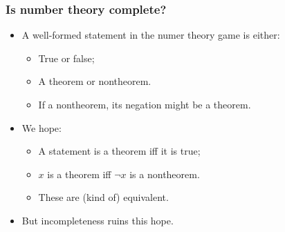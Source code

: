 \documentclass[mathserif]{beamer}
\begin{document}
\begin{frame}
\frametitle{Is number theory complete?}
\label{sec-2-5}
\begin{itemize}

\item A well-formed statement in the numer theory game is either:
\label{sec-2-5-1}%
\begin{itemize}

\item True or false;\\
\label{sec-2-5-1-1}%
\item A theorem or nontheorem.\\
\label{sec-2-5-1-2}%
\item If a nontheorem, its negation might be a theorem.\\
\label{sec-2-5-1-3}%
\end{itemize} %

\item We hope:
\label{sec-2-5-2}%
\begin{itemize}

\item A statement is a theorem iff it is true;\\
\label{sec-2-5-2-1}%
\item $x$ is a theorem iff $¬x$ is a nontheorem.\\
\label{sec-2-5-2-2}%
\item These are (kind of) equivalent.\\
\label{sec-2-5-2-3}%
\end{itemize} %

\item But incompleteness ruins this hope.\\
\label{sec-2-5-3}%
\end{itemize} %
\end{frame}
\end{document}
